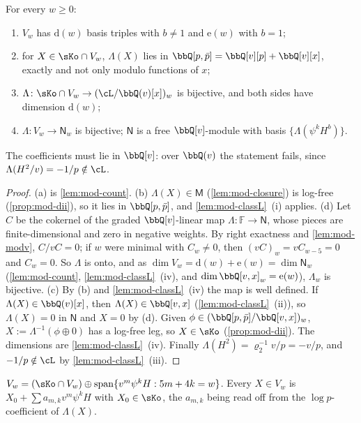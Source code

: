\begin{thm}
\label{thm:mod-lattice}
For every $w\geq 0$:
\begin{enumerate}
\item[(a)] $V_w$ has $\mathrm d(w)$ basis triples with $b\neq 1$ and $\mathrm e(w)$ with $b=1$;
\item[(b)] for $X\in\sKo\cap V_w$, $\Lambda(X)$ lies in $\bbQ[p,\bar p]=\bbQ[v][p]+\bbQ[v][x]$, exactly and not only modulo functions of $x$;
\item[(c)] $\Lambda\colon\sKo\cap V_w\to(\cL/\bbQ(v)[x])_w$ is bijective, and both sides have dimension $\mathrm d(w)$;
\item[(d)] $\Lambda\colon V_w\to\mathsf N_w$ is bijective; $\mathsf N$ is a free $\bbQ[v]$-module with basis $\{\Lambda(\psi^kH^b)\}$.
\end{enumerate}
The coefficients must lie in $\bbQ[v]$: over $\bbQ(v)$ the statement fails, since $\Lambda(H^2/v)=-1/p\notin\cL$.
\end{thm}

\begin{proof}
(a) is \cref{lem:mod-count}. (b) $\Lambda(X)\in\mathsf M$ (\cref{lem:mod-closure}) is log-free (\cref{prop:mod-dii}), so it lies in $\bbQ[p,\bar p]$, and \cref{lem:mod-classL}~(i) applies. (d) Let $C$ be the cokernel of the graded $\bbQ[v]$-linear map $\Lambda\colon\mathbb F\to\mathsf N$, whose pieces are finite-dimensional and zero in negative weights. By right exactness and \cref{lem:mod-modv}, $C/vC=0$; if $w$ were minimal with $C_w\neq 0$, then $(vC)_w=vC_{w-5}=0$ and $C_w=0$. So $\Lambda$ is onto, and as $\dim V_w=\mathrm d(w)+\mathrm e(w)=\dim\mathsf N_w$ (\cref{lem:mod-count}, \cref{lem:mod-classL}~(iv), and $\dim\bbQ[v,x]_w=\mathrm e(w)$), $\Lambda_w$ is bijective. (c) By (b) and \cref{lem:mod-classL}~(iv) the map is well defined. If $\Lambda(X)\in\bbQ(v)[x]$, then $\Lambda(X)\in\bbQ[v,x]$ (\cref{lem:mod-classL}~(ii)), so $\Lambda(X)=0$ in $\mathsf N$ and $X=0$ by (d). Given $\phi\in(\bbQ[p,\bar p]/\bbQ[v,x])_w$, $X:=\Lambda^{-1}(\phi\oplus 0)$ has a log-free leg, so $X\in\sKo$ (\cref{prop:mod-dii}). The dimensions are \cref{lem:mod-classL}~(iv). Finally $\Lambda(H^2)=\varrho_2^{-1}v/p=-v/p$, and $-1/p\notin\cL$ by \cref{lem:mod-classL}~(iii).
\end{proof}

\begin{cor}[Splitting of $V_w$]
\label{cor:mod-split}
$V_w=(\sKo\cap V_w)\oplus\operatorname{span}\{v^m\psi^kH:5m+4k=w\}$. Every $X\in V_w$ is $X_0+\sum a_{m,k}v^m\psi^kH$ with $X_0\in\sKo$, the $a_{m,k}$ being read off from the $\log p$-coefficient of $\Lambda(X)$.
\end{cor}

